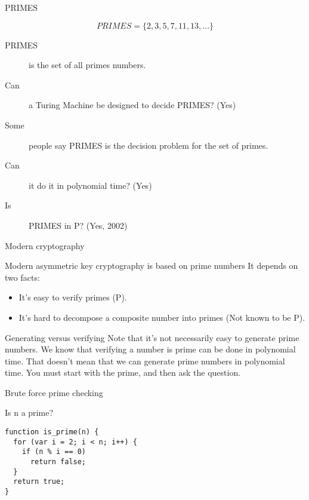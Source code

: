 \begin{frame}{PRIMES}
  \begin{definition}
    $$ PRIMES = \{ 2, 3, 5, 7, 11, 13, ... \} $$
  \end{definition}
  \begin{description}
    \item[PRIMES] is the set of all primes numbers.
    \item[Can] a Turing Machine be designed to decide PRIMES? (Yes)
    \item[Some] people say PRIMES is the decision problem for the set of primes.
    \item[Can] it do it in polynomial time? (Yes)
    \item[Is] PRIMES in P? (Yes, 2002)
  \end{description}
\end{frame}

\begin{frame}{Modern cryptography}
  \begin{alertblock}{Modern asymmetric key cryptography is based on prime numbers}
    It depends on two facts:
    \begin{itemize}
      \item It's easy to verify primes (P).
      \item It's hard to decompose a composite number into primes (Not known to be P).
    \end{itemize}
  \end{alertblock}
  \begin{alertblock}{Generating versus verifying}
    Note that it's not necessarily easy to generate prime numbers.
    We know that verifying a number is prime can be done in polynomial time.
    That doesn't mean that we can generate prime numbers in polynomial time.
    You must start with the prime, and then ask the question.
  \end{alertblock}

\end{frame}

\begin{frame}[fragile]{Brute force prime checking}
  \begin{alertblock}{Is n a prime?}
    \begin{verbatim}
function is_prime(n) {
  for (var i = 2; i < n; i++) {
    if (n % i == 0)
      return false;
  }
  return true;
}
    \end{verbatim}
  \end{alertblock}
\end{frame}

